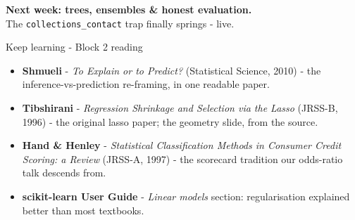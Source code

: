 \documentclass[10pt,aspectratio=169]{beamer}
\begin{document}
\begin{frame}[plain]
  \begin{center}
    \vspace{1.5cm}
    {\LARGE\textbf{Next week: trees, ensembles \& honest evaluation.}}\\[0.6cm]
    {\normalsize The \texttt{collections\_contact} trap finally springs -
    live.}
  \end{center}
\end{frame}

\begin{frame}{Keep learning - Block 2 reading}
  \begin{itemize}
    \item \textbf{Shmueli} - \emph{To Explain or to Predict?}
          (Statistical Science, 2010) - the inference-vs-prediction
          re-framing, in one readable paper.
    \item \textbf{Tibshirani} - \emph{Regression Shrinkage and Selection
          via the Lasso} (JRSS-B, 1996) - the original lasso paper; the
          geometry slide, from the source.
    \item \textbf{Hand \& Henley} - \emph{Statistical Classification
          Methods in Consumer Credit Scoring: a Review} (JRSS-A, 1997) -
          the scorecard tradition our odds-ratio talk descends from.
    \item \textbf{scikit-learn User Guide} - \emph{Linear models} section:
          regularisation explained better than most textbooks.
  \end{itemize}
\end{frame}
\end{document}
